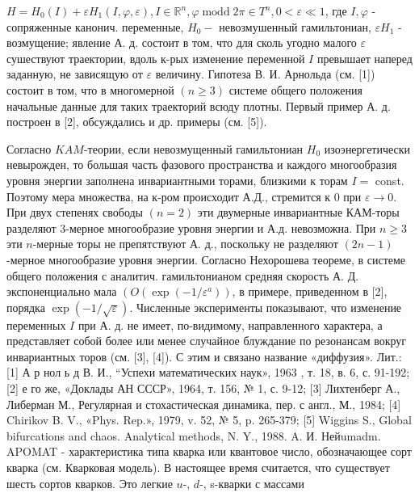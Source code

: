 \documentclass[10pt]{article}
\begin{document}
$H=H_{0}(I)+\varepsilon H_{1}(I, \varphi, \varepsilon), I \in \mathbb{R}^{n}, \varphi \operatorname{modd} 2 \pi \in T^{n}, 0<\varepsilon \ll 1$, где $I, \varphi$ - сопряженные канонич. переменные, $H_{0}-$ невозмушенный гамильтониан, $\varepsilon H_{1}$ - возмущение; явление А. д. состоит в том, что для сколь угодно малого $\varepsilon$ сушествуют траектории, вдоль к-рых изменение переменной $I$ превышает наперед заданную, не зависящую от $\varepsilon$ величину. Гипотеза В. И. Арнольда (см. [1]) состоит в том, что в многомерной $(n \geqslant 3)$ системе общего положения начальные данные для таких траекторий всюду плотны. Первый пример А. д. построен в [2], обсуждались и др. примеры (см. [5]).



Согласно $K A M$-теории, если невозмущенный гамильтониан $H_{0}$ изоэнергетически невырожден, то большая часть фазового пространства и каждого многообразия уровня энергии заполнена инвариантными торами, близкими к торам $I=$ const. Поэтому мера множества, на к-ром происходит А.Д., стремится к 0 при $\varepsilon \rightarrow 0$. При двух степенях свободы $(n=2)$ эти двумерные инвариантные КАМ-торы разделяют 3-мерное многообразие уровня энергии и А.д. невозможна. При $n \geqslant 3$ эти $n$-мерные торы не препятствуют А. д., поскольку не разделяют $(2 n-1)$-мерное многообразие уровня энергии. Согласно Нехорошева теореме, в системе общего положения с аналитич. гамильтонианом средняя скорость А. Д. экспоненциально мала $\left(O\left(\exp \left(-1 / \varepsilon^{a}\right)\right)\right.$, в примере, приведенном в [2], порядка $\exp (-1 / \sqrt{\varepsilon})$. Численные эксперименты показывают, что изменение переменных $I$ при А. д. не имеет, по-видимому, направленного характера, а представляет собой более или менее случайное блуждание по резонансам вокруг инвариантных торов (см. [3], [4]). С этим и связано название «диффузия». Лит.: [1] А р нол ь д В. И., “Успехи математических наук», 1963 , т. 18, в. 6, с. 91-192; [2] е го же, «Доклады АН СССР», 1964, т. 156, № 1, с. 9-12; [3] Лихтенберг А., Либерман М., Регулярная и стохастическая динамика, пер. с англ., М., 1984; [4] Chirikov B. V., «Phys. Rep.», 1979, v. 52, № 5, p. 265-379; [5] Wiggins S., Global bifurcations and chaos. Analytical methods, N. Y., 1988. A. И. Нейumadm. APOMAT - характеристика типа кварка или квантовое число, обозначающее сорт кварка (см. Кварковая модель). В настоящее время считается, что существует шесть сортов кварков. Это легкие $u$-, $d$-, s-кварки с массами
\end{document}
